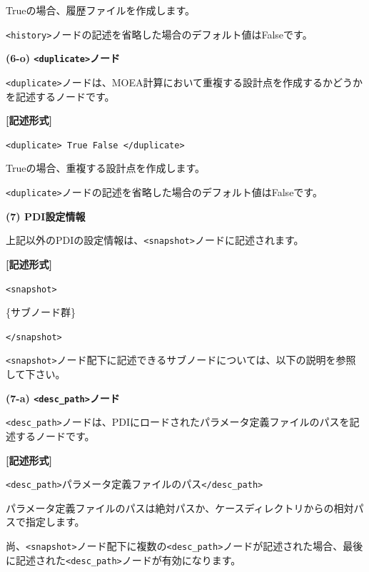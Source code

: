 \documentclass[a4paper,11pt]{jarticle}
\begin{document}
{\vspace{8pt}
\leftskip=0pt
Trueの場合、履歴ファイルを作成します。

\texttt{<history>}ノードの記述を省略した場合のデフォルト値はFalseです。

\vspace{12pt}
\textbf{(6-o) \texttt{<duplicate>}ノード}

\texttt{<duplicate>}ノードは、MOEA計算において重複する設計点を作成するかどうかを記述するノードです。

\vspace{8pt}
\leftskip=12pt
\textbf{[記述形式]}

\leftskip=42pt
\texttt{<duplicate> True \textbar{} False </duplicate>}

\vspace{8pt}
\leftskip=0pt
Trueの場合、重複する設計点を作成します。

\texttt{<duplicate>}ノードの記述を省略した場合のデフォルト値はFalseです。


\vspace{12pt}
\textbf{(7) PDI設定情報}

上記以外のPDIの設定情報は、\texttt{<snapshot>}ノードに記述されます。

\vspace{8pt}
\leftskip=12pt
\textbf{[記述形式]}

\leftskip=42pt
\texttt{<snapshot>}    

\parindent=14pt
\{サブノード群\}

\parindent=0pt
\texttt{</snapshot>}

\vspace{8pt}
\leftskip=0pt
\texttt{<snapshot>}ノード配下に記述できるサブノードについては、以下の説明を参照して下さい。

\vspace{12pt}
\textbf{(7-a) \texttt{<desc\_path>}ノード}

\texttt{<desc\_path>}ノードは、PDIにロードされたパラメータ定義ファイルのパスを記述するノードです。

\vspace{8pt}
\leftskip=12pt
\textbf{[記述形式]}

\leftskip=42pt
\texttt{<desc\_path>}パラメータ定義ファイルのパス\texttt{</desc\_path>}

\vspace{8pt}
\leftskip=0pt
パラメータ定義ファイルのパスは絶対パスか、ケースディレクトリからの相対パスで指定します。

尚、\texttt{<snapshot>}ノード配下に複数の\texttt{<desc\_path>}ノードが記述された場合、最後に記述された\texttt{<desc\_path>}ノードが有効になります。

}
\end{document}

